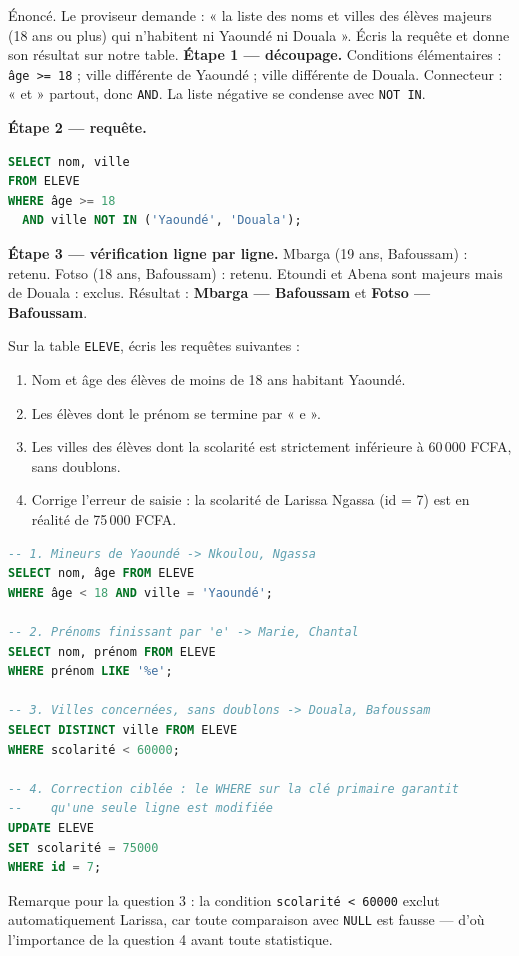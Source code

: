 \documentclass[11pt]{article}
\begin{document}
\begin{exoresolu}
Énoncé. Le proviseur demande : « la liste des noms et villes des élèves majeurs (18 ans ou plus) qui n'habitent ni Yaoundé ni Douala ». Écris la requête et donne son résultat sur notre table.
\tcblower
\textbf{Étape 1 — découpage.} Conditions élémentaires : \texttt{âge >= 18} ; ville différente de Yaoundé ; ville différente de Douala. Connecteur : « et » partout, donc \texttt{AND}. La liste négative se condense avec \texttt{NOT IN}.

\textbf{Étape 2 — requête.}
\begin{lstlisting}[language=SQL]
SELECT nom, ville
FROM ELEVE
WHERE âge >= 18
  AND ville NOT IN ('Yaoundé', 'Douala');
\end{lstlisting}

\textbf{Étape 3 — vérification ligne par ligne.} Mbarga (19 ans, Bafoussam) : retenu. Fotso (18 ans, Bafoussam) : retenu. Etoundi et Abena sont majeurs mais de Douala : exclus. Résultat : \textbf{Mbarga — Bafoussam} et \textbf{Fotso — Bafoussam}.
\end{exoresolu}

\begin{exercice}
Sur la table \texttt{ELEVE}, écris les requêtes suivantes :
\begin{enumerate}
\item Nom et âge des élèves de moins de 18 ans habitant Yaoundé.
\item Les élèves dont le prénom se termine par « e ».
\item Les villes des élèves dont la scolarité est strictement inférieure à 60\,000 FCFA, sans doublons.
\item Corrige l'erreur de saisie : la scolarité de Larissa Ngassa (id = 7) est en réalité de 75\,000 FCFA.
\end{enumerate}
\end{exercice}

\begin{corrige}[Exercice 1]
\begin{lstlisting}[language=SQL]
-- 1. Mineurs de Yaoundé -> Nkoulou, Ngassa
SELECT nom, âge FROM ELEVE
WHERE âge < 18 AND ville = 'Yaoundé';

-- 2. Prénoms finissant par 'e' -> Marie, Chantal
SELECT nom, prénom FROM ELEVE
WHERE prénom LIKE '%e';

-- 3. Villes concernées, sans doublons -> Douala, Bafoussam
SELECT DISTINCT ville FROM ELEVE
WHERE scolarité < 60000;

-- 4. Correction ciblée : le WHERE sur la clé primaire garantit
--    qu'une seule ligne est modifiée
UPDATE ELEVE
SET scolarité = 75000
WHERE id = 7;
\end{lstlisting}
Remarque pour la question 3 : la condition \texttt{scolarité < 60000} exclut automatiquement Larissa, car toute comparaison avec \texttt{NULL} est fausse — d'où l'importance de la question 4 avant toute statistique.
\end{corrige}
\end{document}
